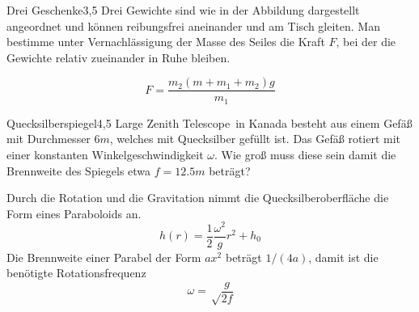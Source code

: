 


\begin{problem}{Drei Geschenke}{3,5}
Drei Gewichte sind wie in der Abbildung dargestellt angeordnet und können reibungsfrei aneinander und am Tisch gleiten. Man bestimme unter Vernachlässigung der Masse des Seiles die Kraft $F$, bei der die Gewichte relativ zueinander in Ruhe bleiben.

\begin{solution}
\[
F = \frac{m_2 (m+m_1+m_2) g}{m_1}
\]
\end{solution}
\end{problem}

\begin{problem}{Quecksilberspiegel}{4,5}
\glqq Large Zenith Telescope\grqq\ in Kanada besteht aus einem Gefäß mit Durchmesser $6 \unit{m}$, welches mit Quecksilber gefüllt ist. Das Gefäß rotiert mit einer konstanten Winkelgeschwindigkeit $\omega$. Wie groß muss diese sein damit die Brennweite des Spiegels etwa $f=12.5 \unit{m}$ beträgt?

\begin{solution}
Durch die Rotation und die Gravitation nimmt die Quecksilberoberfläche die Form eines Paraboloids an.
\[
h(r) = \frac12 \frac{\omega^2}{g} r^2 + h_0
\]
Die Brennweite einer Parabel der Form $ax^2$ beträgt $1/(4a)$, damit ist die benötigte Rotationsfrequenz
\[
\omega = \sqrt\frac{g}{2 f}
\]
\end{solution}

\end{problem}

